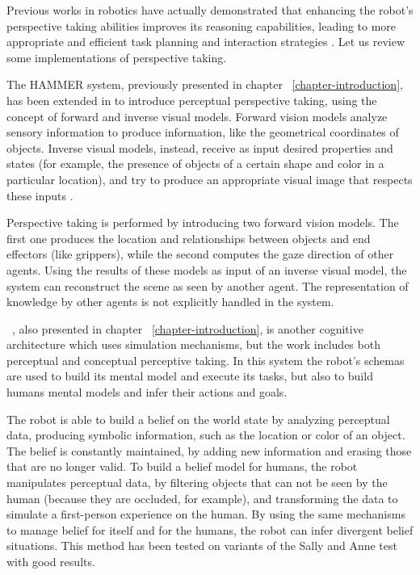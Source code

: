 Previous works in robotics have actually demonstrated that enhancing the robot's perspective taking abilities improves its reasoning capabilities, leading to more appropriate and efficient task planning and interaction strategies \cite{Trafton2005,ros2010one,breazeal2006}. Let us review some implementations of perspective taking.

The HAMMER system, previously presented in chapter ~\ref{chapter-introduction}, has been extended in \cite{johnson2005perceptual} to introduce perceptual perspective taking, using the concept of forward and inverse visual models. Forward vision models analyze sensory information to produce information, like the geometrical coordinates of objects. Inverse visual models, instead, receive as input desired properties and states (for example, the presence of objects of a certain shape and color in a particular location), and try to produce an appropriate visual image that respects these inputs .

Perspective taking is performed by introducing two forward vision models. The first one produces the location and relationships between objects and end effectors (like grippers), while the second  computes the gaze direction of other agents. Using the results of these models as input of an inverse visual model, the system can reconstruct the scene as seen by another agent. The representation of knowledge by other agents is not explicitly handled in the system. 

~\cite{BreazealGB09}, also presented in chapter ~\ref{chapter-introduction}, is another cognitive architecture which uses simulation mechanisms, but the work  includes both perceptual and conceptual perceptive taking. In this system the robot's schemas are used to build its mental model and execute its tasks, but also to build humans mental models and infer their actions and goals.

The robot is able to build a belief on the world state by analyzing perceptual data, producing symbolic information, such as the location or color of an object. The belief is constantly maintained, by adding new information and erasing those that are no longer valid.
To build a belief model for humans, the robot manipulates perceptual data, by filtering objects that can not be seen by the human (because they are occluded, for example), and transforming the data to simulate a first-person experience on the human. By using the same mechanisms to manage belief for itself and for the humans, the robot can infer divergent belief situations. This method has been tested on variants of the Sally and Anne test with good results.

